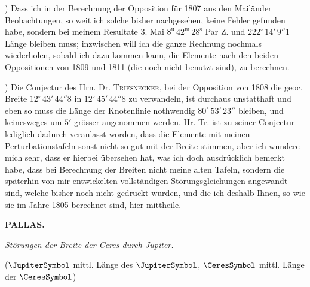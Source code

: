 \par{}) Dass ich in der Berechnung der Opposition für 1807 aus den Mailänder Beobachtungen, so weit ich solche bisher nachgesehen, keine Fehler gefunden habe, sondern bei meinem Resultate 3. Mai $8^{\mathrm u}\,42^{\mathrm m}\,28^{\mathrm s}$ Par Z. und $222^\circ\,14'\,9''1$ Länge bleiben muss; inzwischen will ich die ganze Rechnung nochmals wiederholen, sobald ich dazu kommen kann, die Elemente nach den beiden Oppositionen von 1809 und 1811 (die noch nicht benutzt sind), zu berechnen.

\par{}) Die Conjectur des Hrn. Dr. \textsc{Triesnecker}, bei der Opposition von 1808 die geoc. Breite $12^\circ\,43'\,44''8$ in $12^\circ\,45'\,44''8$ zu verwandeln, ist durchaus unstatthaft und eben so muss die Länge der Knotenlinie nothwendig $80^\circ\,53'\,23''$ bleiben, und keinesweges um $5'$ grösser angenommen werden. Hr. Tr. ist zu seiner Conjectur lediglich dadurch veranlasst worden, dass die Elemente mit meinen Perturbationstafeln sonst nicht so gut mit der Breite stimmen, aber ich wundere mich sehr, dass er hierbei übersehen hat, was ich doch ausdrücklich bemerkt habe, dass bei Berechnung der Breiten nicht meine alten Tafeln, sondern die späterhin von mir entwickelten vollständigen Störungsgleichungen angewandt sind, welche bisher noch nicht gedruckt wurden, und die ich deshalb Ihnen, so wie sie im Jahre 1805 berechnet sind, hier mittheile.
\clearpage
\thispagestyle{empty}
\noindent{}%
\makebox[12mm][l]{}%
\parbox[t]{\dimexpr\linewidth-24mm\relax}{\centering\footnotesize\bfseries PALLAS.\par}%
\par\nobreak\medskip
\begin{center}\emph{Störungen der Breite der Ceres durch Jupiter.}

($\JupiterSymbol$ mittl. Länge des $\JupiterSymbol$, $\CeresSymbol$ mittl. Länge der $\CeresSymbol$)
\end{center}
